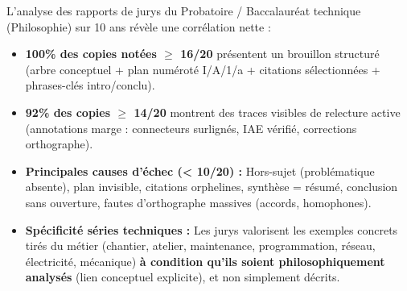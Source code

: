 \documentclass[11pt]{article}
\begin{document}
\begin{savaistu}
L'analyse des rapports de jurys du Probatoire / Baccalaur\'eat technique (Philosophie) sur 10 ans r\'ev\`ele une corr\'elation nette :
\begin{itemize}
    \item \textbf{100\% des copies not\'ees $\ge$ 16/20} pr\'esentent un brouillon structur\'e (arbre conceptuel + plan num\'erot\'e I/A/1/a + citations s\'electionn\'ees + phrases-cl\'es intro/conclu).
    \item \textbf{92\% des copies $\ge$ 14/20} montrent des traces visibles de relecture active (annotations marge : connecteurs surlign\'es, IAE v\'erifi\'e, corrections orthographe).
    \item \textbf{Principales causes d'\'echec (< 10/20) :} Hors-sujet (probl\'ematique absente), plan invisible, citations orphelines, synth\`ese = r\'esum\'e, conclusion sans ouverture, fautes d'orthographe massives (accords, homophones).
    \item \textbf{Sp\'ecificit\'e s\'eries techniques :} Les jurys valorisent les exemples concrets tir\'es du m\'etier (chantier, atelier, maintenance, programmation, r\'eseau, \'electricit\'e, m\'ecanique) \textbf{\`a condition qu'ils soient philosophiquement analys\'es} (lien conceptuel explicite), et non simplement d\'ecrits.
\end{itemize}
\end{savaistu}
\end{document}
